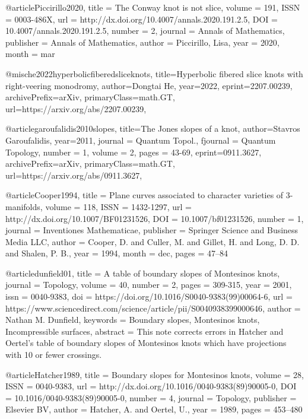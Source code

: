 @article{Piccirillo2020,
  title = {The Conway knot is not slice},
  volume = {191},
  ISSN = {0003-486X},
  url = {http://dx.doi.org/10.4007/annals.2020.191.2.5},
  DOI = {10.4007/annals.2020.191.2.5},
  number = {2},
  journal = {Annals of Mathematics},
  publisher = {Annals of Mathematics},
  author = {Piccirillo,  Lisa},
  year = {2020},
  month = mar 
}

@misc{he2022hyperbolicfiberedsliceknots,
  title={Hyperbolic fibered slice knots with right-veering monodromy}, 
  author={Dongtai He},
  year={2022},
  eprint={2207.00239},
  archivePrefix={arXiv},
  primaryClass={math.GT},
  url={https://arxiv.org/abs/2207.00239}, 
}



@article{garoufalidis2010slopes,
  title={The {Jones} slopes of a knot}, 
  author={Stavros Garoufalidis},
  year={2011},
  journal = {Quantum Topol.},
  fjournal = {Quantum Topology},
  number = {1},
  volume = {2},
  pages = {43-69},
  eprint={0911.3627},
  archivePrefix={arXiv},
  primaryClass={math.GT},
  url={https://arxiv.org/abs/0911.3627}, 
}

@article{Cooper1994,
  title = {Plane curves associated to character varieties of 3-manifolds},
  volume = {118},
  ISSN = {1432-1297},
  url = {http://dx.doi.org/10.1007/BF01231526},
  DOI = {10.1007/bf01231526},
  number = {1},
  journal = {Inventiones Mathematicae},
  publisher = {Springer Science and Business Media LLC},
  author = {Cooper,  D. and Culler,  M. and Gillet,  H. and Long,  D. D. and Shalen,  P. B.},
  year = {1994},
  month = dec,
  pages = {47--84}
}

@article{dunfield01,
  title = {A table of boundary slopes of Montesinos knots},
  journal = {Topology},
  volume = {40},
  number = {2},
  pages = {309-315},
  year = {2001},
  issn = {0040-9383},
  doi = {https://doi.org/10.1016/S0040-9383(99)00064-6},
  url = {https://www.sciencedirect.com/science/article/pii/S0040938399000646},
  author = {Nathan M. Dunfield},
  keywords = {Boundary slopes, Montesinos knots, Incompressible surfaces},
  abstract = {This note corrects errors in Hatcher and Oertel's table of boundary slopes of Montesinos knots which have projections with 10 or fewer crossings.}
}

@article{Hatcher1989,
  title = {Boundary slopes for {Montesinos} knots},
  volume = {28},
  ISSN = {0040-9383},
  url = {http://dx.doi.org/10.1016/0040-9383(89)90005-0},
  DOI = {10.1016/0040-9383(89)90005-0},
  number = {4},
  journal = {Topology},
  publisher = {Elsevier BV},
  author = {Hatcher,  A. and Oertel,  U.},
  year = {1989},
  pages = {453--480}
}

